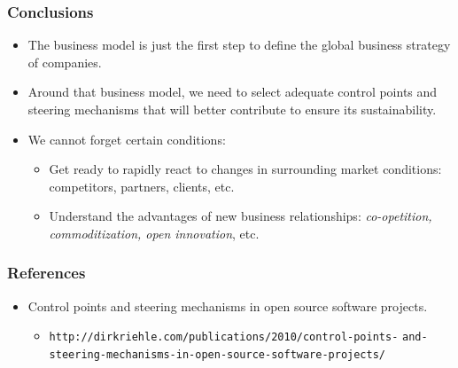 
\begin{frame}
 \frametitle{Conclusions}
\begin{itemize}
 \item The business model is just the first step to define the global business strategy of companies.
 \item Around that business model, we need to select adequate control points and steering mechanisms
that will better contribute to ensure its sustainability.
 \item We cannot forget certain conditions:
  \begin{itemize}
   \item Get ready to rapidly react to changes in surrounding market conditions: competitors, partners,
clients, etc.
   \item Understand the advantages of new business relationships: \textit{co-opetition, commoditization, open innovation}, etc.
  \end{itemize}

\end{itemize}

\end{frame}


\begin{frame}
 \frametitle{References}
\begin{itemize}
 \item Control points and steering mechanisms in open source software projects.
  \begin{itemize}
  \item \footnotesize{\texttt{http://dirkriehle.com/publications/2010/control-points-}}
    \footnotesize{\texttt{and-steering-mechanisms-in-open-source-software-projects/}}
  \end{itemize}
\end{itemize}

\end{frame}


